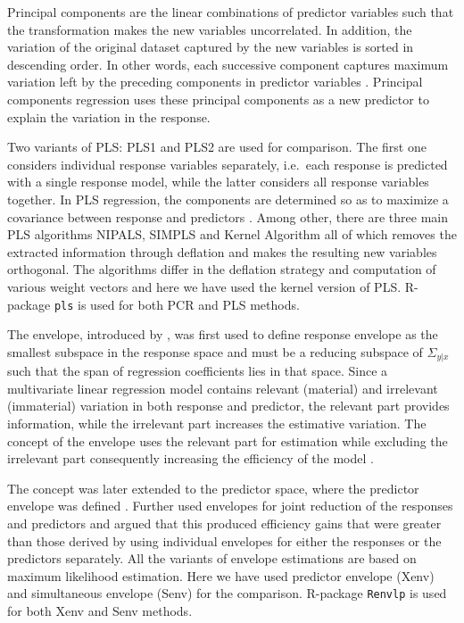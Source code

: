 \documentclass[review]{elsarticle}
\providecommand{\tightlist}{%
  \setlength{\itemsep}{0pt}\setlength{\parskip}{0pt}}
\begin{document}
\begin{description}
\tightlist
\item[\emph{Principal Components Regression (PCR):}]
Principal components are the linear combinations of predictor variables such that the transformation makes the new variables uncorrelated. In addition, the variation of the original dataset captured by the new variables is sorted in descending order. In other words, each successive component captures maximum variation left by the preceding components in predictor variables \citep{Jolliffe2002}. Principal components regression uses these principal components as a new predictor to explain the variation in the response.
\item[\emph{Partial Least Squares (PLS):}]
Two variants of PLS: PLS1 and PLS2 are used for comparison. The first one considers individual response variables separately, i.e.~each response is predicted with a single response model, while the latter considers all response variables together. In PLS regression, the components are determined so as to maximize a covariance between response and predictors \citep{DeJong1993}. Among other, there are three main PLS algorithms NIPALS, SIMPLS and Kernel Algorithm all of which removes the extracted information through deflation and makes the resulting new variables orthogonal. The algorithms differ in the deflation strategy and computation of various weight vectors \citep{alin09} and here we have used the kernel version of PLS. R-package \texttt{pls} \citep{pls2018} is used for both PCR and PLS methods.
\item[\emph{Envelopes:}]
The envelope, introduced by \citet{Cook2007a}, was first used to define response envelope \citep{cook2010envelope} as the smallest subspace in the response space and must be a reducing subspace of \(\Sigma_{y|x}\) such that the span of regression coefficients lies in that space. Since a multivariate linear regression model contains relevant (material) and irrelevant (immaterial) variation in both response and predictor, the relevant part provides information, while the irrelevant part increases the estimative variation. The concept of the envelope uses the relevant part for estimation while excluding the irrelevant part consequently increasing the efficiency of the model \citep{cook2016algorithms}.

The concept was later extended to the predictor space, where the predictor envelope was defined \citep{cook2013envelopes}. Further \citet{cook2015simultaneous} used envelopes for joint reduction of the responses and predictors and argued that this produced efficiency gains that were greater than those derived by using individual envelopes for either the responses or the predictors separately. All the variants of envelope estimations are based on maximum likelihood estimation. Here we have used predictor envelope (Xenv) and simultaneous envelope (Senv) for the comparison. R-package \texttt{Renvlp} \citep{env2018} is used for both Xenv and Senv methods.
\end{description}
\end{document}
